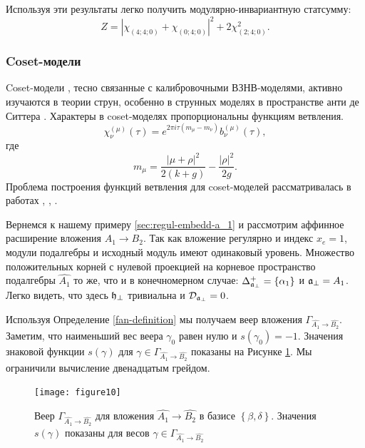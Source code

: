Используя эти результаты легко получить модулярно-инвариантную статсумму:
\begin{equation*}
  \label{eq:45}
  Z=\left|\chi_{(4;4;0)}+\chi_{(0;4;0)}\right|^2+2\chi_{(2;4;0)}^2.
\end{equation*}

\subsubsection{Coset-модели}
\label{sec:coset-models}

Coset-модели \cite{Goddard198588}, тесно связанные с калибровочными ВЗНВ-моделями, активно изучаются в теории струн, особенно в струнных моделях в пространстве анти де Ситтера
\cite{Maldacena:2000hw,Maldacena:2000kv,Maldacena:2001km,Maldacena:2001ky,Aharony:1999ti}. Характеры в coset-моделях пропорциональны функциям ветвления.
\begin{equation}
  \label{eq:31}
  \chi^{(\mu)}_{\nu}(\tau)=e^{2\pi i \tau (m_{\mu}-m_{\nu})} b^{(\mu)}_{\nu}(\tau),
\end{equation}
где
\begin{equation*}
  \label{eq:46}
  m_{\mu}=\frac{\left|\mu+\rho\right|^2}{2(k+g)}-\frac{\left|\rho\right|^2}{2g}.
\end{equation*}
Проблема построения функций ветвления для  coset-моделей рассматривалась в работах  \cite{Dunbar:1992gh}, \cite{Hwang:1994yr}, \cite{lu1994branching}.

Вернемся к нашему примеру \ref{sec:regul-embedd-a_1} и рассмотрим аффинное расширение вложения $A_1 \rightarrow B_2$. Так как вложение регулярно и индекс $x_e=1$, модули подалгебры и исходный модуль имеют одинаковый уровень. Множество положительных корней с нулевой проекцией на корневое пространство подалгебры  $\hat{A_1}$ то же, что и в конечномерном случае: $\Delta^{+}_{\mathfrak{a}_{\perp}}=\left\{ \alpha_1 \right\}$ и $\mathfrak{a}_{\perp}=A_1$. Легко видеть, что здесь $\mathfrak{h}_{\perp}$ тривиальна и  ${\cal D}_{\mathfrak{a}_{\perp}}=0$.

Используя Определение \ref{fan-definition} мы получаем веер вложения $\Gamma_{\hat{A_1} \longrightarrow  \hat{B_2} }$. Заметим, что наименьший вес веера $\gamma_0$ равен нулю и  $s\left( \gamma_0 \right)=-1$. Значения знаковой функции  $s(\gamma)$ для $ \gamma \in \Gamma_{\hat{A_1} \longrightarrow  \hat{B_2} }$ показаны на Рисунке \ref{fig:AffineB2A1Fan}.
Мы ограничили вычисление двенадцатым грейдом. 
\begin{figure}[h!bt]
  \centering
  \texttt{[image: figure10]}
  \caption{Веер $\Gamma_{\hat{A_1}\rightarrow \hat{B_2}}$ для вложения $\hat{A_1}\rightarrow \hat{B_2}$ в базисе $\left\{\beta,\delta \right\}$. Значения $s(\gamma)$ показаны для весов $\gamma\in \Gamma_{\hat{A_1}\rightarrow \hat{B_2}}$}
  \label{fig:AffineB2A1Fan}
\end{figure}


